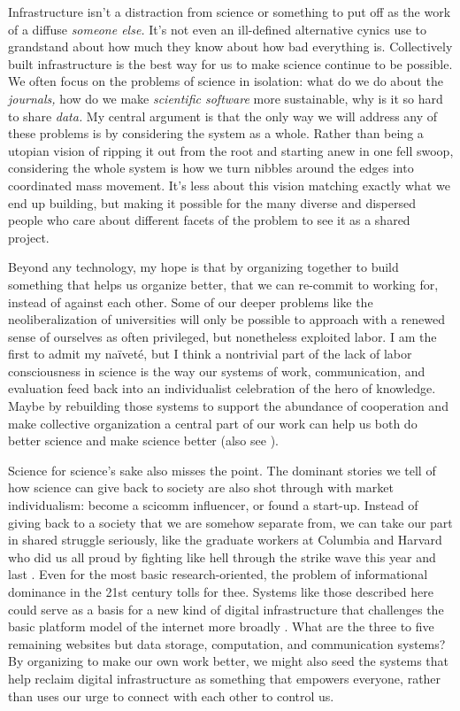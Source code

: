 Infrastructure isn't a distraction from science or something to put off
as the work of a diffuse \emph{someone else.} It's not even an
ill-defined alternative cynics use to grandstand about how much they
know about how bad everything is. Collectively built infrastructure is
the best way for us to make science continue to be possible. We often
focus on the problems of science in isolation: what do we do about the
\emph{journals,} how do we make \emph{scientific software} more
sustainable, why is it so hard to share \emph{data.} My central argument
is that the only way we will address any of these problems is by
considering the system as a whole. Rather than being a utopian vision of
ripping it out from the root and starting anew in one fell swoop,
considering the whole system is how we turn nibbles around the edges
into coordinated mass movement. It's less about this vision matching
exactly what we end up building, but making it possible for the many
diverse and dispersed people who care about different facets of the
problem to see it as a shared project.

Beyond any technology, my hope is that by organizing together to build
something that helps us organize better, that we can re-commit to
working for, instead of against each other. Some of our deeper problems
like the neoliberalization of universities will only be possible to
approach with a renewed sense of ourselves as often privileged, but
nonetheless exploited labor. I am the first to admit my naïveté, but I
think a nontrivial part of the lack of labor consciousness in science is
the way our systems of work, communication, and evaluation feed back
into an individualist celebration of the hero of knowledge. Maybe by
rebuilding those systems to support the abundance of cooperation and
make collective organization a central part of our work can help us both
do better science and make science better (also see \citep{mooreWhyOpenScience2022} ).

Science for science's sake also misses the point. The dominant stories
we tell of how science can give back to society are also shot through
with market individualism: become a scicomm influencer, or found a
start-up. Instead of giving back to a society that we are somehow
separate from, we can take our part in shared struggle seriously, like
the graduate workers at Columbia and Harvard who did us all proud by
fighting like hell through the strike wave this year and last \citep{wongStudentWorkersColumbia2022, changHarvardGraduateStudent2021} .
Even for the most basic research-oriented, the problem of informational
dominance in the 21st century tolls for thee. Systems like those
described here could serve as a basis for a new kind of digital
infrastructure that challenges the basic platform model of the internet
more broadly \citep{brookerWasDevastatedMan2018} . What are the
three to five remaining websites but data storage, computation, and
communication systems? By organizing to make our own work better, we
might also seed the systems that help reclaim digital infrastructure as
something that empowers everyone, rather than uses our urge to connect
with each other to control us.

